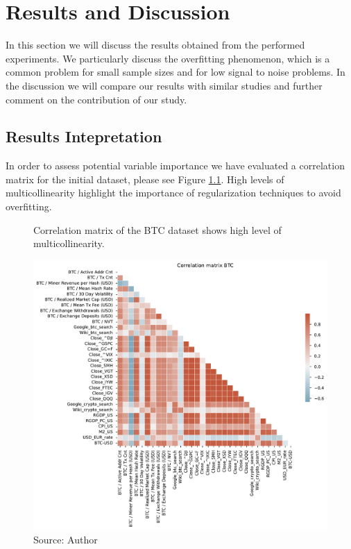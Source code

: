 \chapter{Results and Discussion}
\label{chap:five}
In this section we will discuss the results obtained from 
the performed experiments. We particularly discuss the 
overfitting phenomenon, which is a common problem
for small sample sizes and for low signal to noise problems. 
In the discussion we will compare our
results with similar studies
and further comment on the 
contribution of our study.

\section{Results Intepretation}
\label{sec:results}
In order to assess potential variable importance
we have evaluated a correlation matrix for the initial
dataset, please see Figure \ref{fig:Corr_btc}. High 
levels of multicollinearity highlight the importance of
regularization techniques to avoid overfitting.

\begin{figure}[!h]
    \centering
    \caption{Correlation matrix of the BTC dataset shows high level of 
    multicollinearity.}
    \includegraphics[width=1\textwidth]{Figures/Corr_btc.pdf}
    \caption*{Source: Author}
    \label{fig:Corr_btc}
\end{figure}

